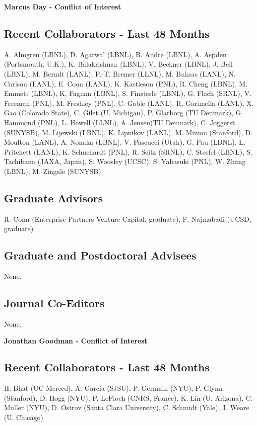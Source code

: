 \documentclass[11pt]{article}
\begin{document}
\newpage

\begin{center}
{\Large{\textbf{Marcus Day - Conflict of Interest}}}
\end{center}

\subsection*{Recent Collaborators - Last 48 Months}
A. Almgren (LBNL), D. Agarwal (LBNL), B. Andre (LBNL), A. Aspden (Portsmouth, U.K.),
K. Balakrishnan (LBNL), V. Beckner (LBNL), J. Bell (LBNL), M. Berndt (LANL), P.-T. Bremer (LLNL), M. Buksas (LANL), N. Carlson (LANL), E. Coon (LANL), K. Kastleson (PNL), R. Cheng (LBNL), M. Emmett (LBNL), K. Fagnan (LBNL), S. Finsterle (LBNL), G. Flach
(SRNL), V. Freeman (PNL), M. Freshley (PNL), C. Gable (LANL), R. Garimella (LANL), X. Gao (Colorado State), C. Gilet (U. Michigan), P. Glarborg (TU Denmark), G. Hammond (PNL), L. Howell (LLNL), A. Jensen(TU Denmark), C. Joggerst (SUNYSB), M. Lijewski (LBNL), K. Lipnikov (LANL), M. Minion (Stanford), D. Moulton (LANL), A. Nonaka (LBNL), V. Pascucci (Utah), G. Pau (LBNL), L. Pritchett (LANL), K. Schuchardt (PNL), R. Seitz (SRNL), C. Steefel (LBNL), S. Tachibana (JAXA, Japan), S. Woosley (UCSC), S. Yabasuki (PNL), W. Zhang (LBNL), M. Zingale (SUNYSB)


\subsection*{Graduate Advisors}
R. Conn (Enterprise Partners Venture Capital, graduate), F. Najmabadi (UCSD, graduate)

\subsection*{Graduate and Postdoctoral Advisees} None.

\subsection*{Journal Co-Editors} None.

\newpage
\begin{center}
{\Large{\textbf{Jonathan Goodman - Conflict of Interest}}}
\end{center}

\subsection*{Recent Collaborators - Last 48 Months}
H. Bhat (UC Merced), A. Garcia (SJSU), P. Germain (NYU), P. Glynn (Stanford), D. Hogg (NYU), P. LeFloch (CNRS, France), K. Lin (U. Arizona), C. Muller (NYU), D. Ostrov (Santa Clara University), C. Schmidt (Yale), J. Weare (U. Chicago)
\end{document}
